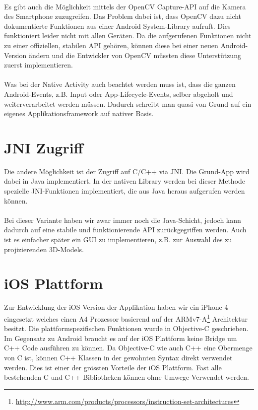 \paragraph{}
Es gibt auch die Möglichkeit mittels der OpenCV Capture-API auf die Kamera des Smartphone zuzugreifen. Das Problem dabei ist, dass OpenCV dazu nicht dokumentierte Funktionen aus einer Android System-Library aufruft. Dies funktioniert leider nicht mit allen Geräten. Da die aufgerufenen Funktionen nicht zu einer offiziellen, stabilen API gehören, können diese bei einer neuen Android-Version ändern und die Entwickler von OpenCV müssten diese Unterstützung zuerst implementieren.

\paragraph{}
Was bei der Native Activity auch beachtet werden muss ist, dass die ganzen Android-Events, z.B. Input oder App-Lifecycle-Events, selber abgeholt und weiterverarbeitet werden müssen. Dadurch schreibt man quasi von Grund auf ein eigenes Applikationsframework auf nativer Basis.


\section{JNI Zugriff}
Die andere Möglichkeit ist der Zugriff auf C/C++ via JNI. Die Grund-App wird dabei in Java implementiert. In der nativen Library werden bei dieser Methode spezielle JNI-Funktionen implementiert, die aus Java heraus aufgerufen werden können.

\paragraph{}
Bei dieser Variante haben wir zwar immer noch die Java-Schicht, jedoch kann dadurch auf eine stabile und funktionierende API zurückgegriffen werden. Auch ist es einfacher später ein GUI zu implementieren, z.B. zur Auswahl des zu projizierenden 3D-Models.


\section{iOS Plattform}
Zur Entwicklung der iOS Version der Applikation haben wir ein iPhone 4 eingesetzt welches einen A4 Prozessor basierend auf der ARMv7-A\footnote{\url{http://www.arm.com/products/processors/instruction-set-architectures}} Architektur besitzt. Die plattformspezifischen Funktionen wurde in Objective-C geschrieben. Im Gegensatz zu Android braucht es auf der iOS Plattform keine Bridge um C++ Code ausführen zu können. Da Objective-C wie auch C++ eine Obermenge von C ist, können C++ Klassen in der gewohnten Syntax direkt verwendet werden. Dies ist einer der grössten Vorteile der iOS Plattform. Fast alle bestehenden C und C++ Bibliotheken können ohne Umwege Verwendet werden.

